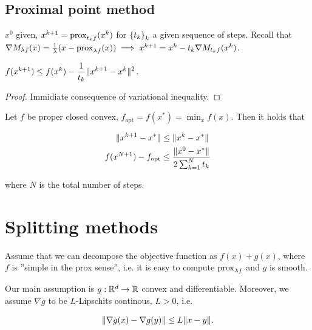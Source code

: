 \subsection{Proximal point method}

$x^0$ given, $x^{k+1} = \mathrm{prox}_{t_k f}(x^k)$ for $\left\{ t_k \right\}_k$ a given sequence of steps. Recall that $\nabla M_{\lambda f}(x) = \frac1\lambda (x - \mathrm{prox}_{\lambda f}(x)) \implies x^{k+1} = x^k - t_k \nabla M_{t_k f}(x^k)$.

\begin{proposition}
    
    $f(x^{k+1}) \le f(x^k) - \displaystyle\frac{1}{t_k} \lVert x^{k+1} - x^k \rVert^2$.

\end{proposition}

\begin{proof}
    
    Immidiate consequence of variational inequality.

\end{proof}

\begin{proposition}
    
    Let $f$ be proper closed convex, $f_{\mathrm{opt}} = f(x^*) = \min_x f(x)$. Then it holds that 

    \begin{align*}
        \lVert x^{k+1} - x^* \rVert &\le \lVert x^k - x^* \rVert \\
        f(x^{N+1}) - f_{\mathrm{opt}} &\le \frac{\lVert x^0 - x^* \rVert}{2\sum_{k=1}^N t_k}
    \end{align*}

    where $N$ is the total number of steps.

\end{proposition}

\section{Splitting methods}

Assume that we can decompose the objective function as $f(x) + g(x)$, where $f$ is ''simple in the prox sense'', i.e. it is easy to compute $\mathrm{prox}_{\lambda f}$ and $g$ is smooth.

Our main assumption is $g : \mathbb{R}^d \to \mathbb{R}$ convex and differentiable. Moreover, we assume $\nabla g$ to be $L$-Lipschits continous, $L > 0$, i.e. 

\[ \lVert \nabla g(x) - \nabla g(y) \rVert \le L\lVert x - y \rVert. \]

